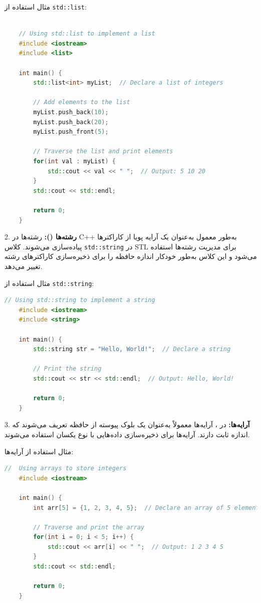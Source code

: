 \documentclass[12pt, a4paper]{report}
\begin{document}
مثال استفاده از \texttt{std::list}:
\LTR
\begin{lstlisting}[language=C++, breaklines=true]

	// Using std::list to implement a list
	#include <iostream>
	#include <list>
	
	int main() {
		std::list<int> myList;  // Declare a list of integers
		
		// Add elements to the list
		myList.push_back(10);
		myList.push_back(20);
		myList.push_front(5);
		
		// Traverse the list and print elements
		for(int val : myList) {
			std::cout << val << " ";  // Output: 5 10 20
		}
		std::cout << std::endl;
		
		return 0;
	}
\end{lstlisting}
\RTL

2. \textbf{رشته‌ها ():} 
رشته‌ها در C++ به‌طور معمول به‌عنوان یک آرایه پویا از کاراکترها پیاده‌سازی می‌شوند. کلاس \texttt{std::string} در STL برای مدیریت رشته‌ها استفاده می‌شود و این کلاس به‌طور خودکار اندازه حافظه را برای ذخیره‌سازی کاراکترهای رشته تغییر می‌دهد.

مثال استفاده از \texttt{std::string}:
\LTR
\begin{lstlisting}[language=C++, breaklines=true]
// Using std::string to implement a string
	#include <iostream>
	#include <string>
	
	int main() {
		std::string str = "Hello, World!";  // Declare a string
		
		// Print the string
		std::cout << str << std::endl;  // Output: Hello, World!
		
		return 0;
	}
\end{lstlisting}
\RTL

3. \textbf{آرایه‌ها:} 
در ، آرایه‌ها معمولاً به‌عنوان یک بلوک پیوسته از حافظه تعریف می‌شوند که اندازه ثابت دارند. آرایه‌ها برای ذخیره‌سازی داده‌هایی با نوع یکسان استفاده می‌شوند.

مثال استفاده از آرایه‌ها:
\LTR
\begin{lstlisting}[language=C++, breaklines=true]
	//  Using arrays to store integers
	#include <iostream>
	
	int main() {
		int arr[5] = {1, 2, 3, 4, 5};  // Declare an array of 5 elements
		
		// Traverse and print the array
		for(int i = 0; i < 5; i++) {
			std::cout << arr[i] << " ";  // Output: 1 2 3 4 5
		}
		std::cout << std::endl;
		
		return 0;
	}
\end{lstlisting}
\RTL
\end{document}
